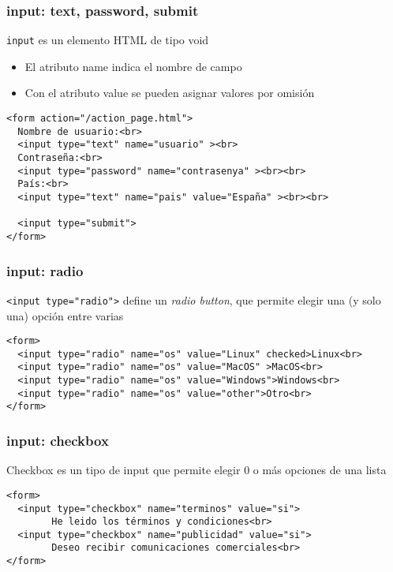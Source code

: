 \documentclass[ucs]{beamer}
\begin{document}
\begin{frame}[fragile]
\frametitle{input: text, password, submit}
\verb|input| es un elemento HTML de tipo void
\begin{itemize}
\item
El atributo name indica el nombre de campo

\item
Con el atributo value se pueden asignar valores por omisión
\end{itemize}

  \begin{scriptsize}
  \begin{verbatim}
<form action="/action_page.html">
  Nombre de usuario:<br>
  <input type="text" name="usuario" ><br>
  Contraseña:<br>
  <input type="password" name="contrasenya" ><br><br>
  País:<br>
  <input type="text" name="pais" value="España" ><br><br>

  <input type="submit">
</form>
  \end{verbatim}
  \end{scriptsize}
\end{frame}



\begin{frame}[fragile]
\frametitle{input: radio}

\verb|<input type="radio">|
define un \emph{radio button}, que permite
elegir una (y solo una) opción entre varias


  \begin{scriptsize}
  \begin{verbatim}
<form>
  <input type="radio" name="os" value="Linux" checked>Linux<br>
  <input type="radio" name="os" value="MacOS" >MacOS<br>
  <input type="radio" name="os" value="Windows">Windows<br>
  <input type="radio" name="os" value="other">Otro<br>
</form>
  \end{verbatim}
  \end{scriptsize}

\end{frame}




\begin{frame}[fragile]
\frametitle{input: checkbox}


Checkbox es un tipo de input que permite elegir 0 o más opciones de
una lista

  \begin{scriptsize}
  \begin{verbatim}
<form>
  <input type="checkbox" name="terminos" value="si">
        He leido los términos y condiciones<br>
  <input type="checkbox" name="publicidad" value="si">
        Deseo recibir comunicaciones comerciales<br>
</form>
  \end{verbatim}
  \end{scriptsize}

\end{frame}
\end{document}
